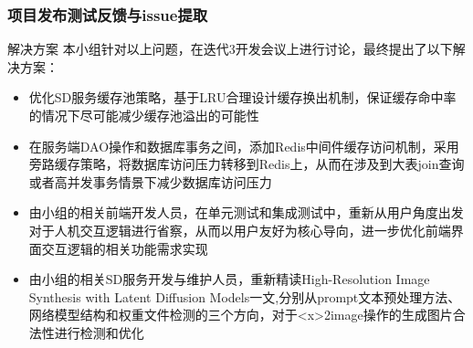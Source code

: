     \begin{frame}
    \frametitle{项目发布测试反馈与issue提取}
        \footnotesize
        \begin{block}{解决方案}
            本小组针对以上问题，在迭代3开发会议上进行讨论，最终提出了以下解决方案：
            \begin{itemize}
                \item 优化SD服务缓存池策略，基于LRU合理设计缓存换出机制，保证缓存命中率的情况下尽可能减少缓存池溢出的可能性
                \item 在服务端DAO操作和数据库事务之间，添加Redis中间件缓存访问机制，采用旁路缓存策略，将数据库访问压力转移到Redis上，从而在涉及到大表join查询或者高并发事务情景下减少数据库访问压力
                \item 由小组的相关前端开发人员，在单元测试和集成测试中，重新从用户角度出发对于人机交互逻辑进行省察，从而以用户友好为核心导向，进一步优化前端界面交互逻辑的相关功能需求实现
                \item 由小组的相关SD服务开发与维护人员，重新精读High-Resolution Image Synthesis with Latent Diffusion Models一文\cite{rombach2021highresolution},分别从prompt文本预处理方法、网络模型结构和权重文件检测的三个方向，对于<x>2image操作的生成图片合法性进行检测和优化
            \end{itemize}
        \end{block}
    \end{frame}





